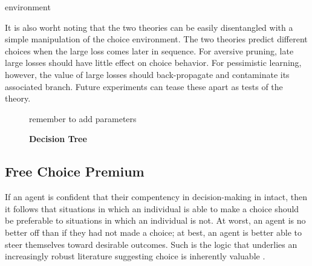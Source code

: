 environment\documentclass[11pt]{article} %
\begin{document}
It is also worht noting that the two theories can be easily disentangled with a
simple manipulation of the choice environment. The two theories predict
different choices when the large loss comes later in sequence. For aversive pruning,
late large losses should have little effect on choice behavior. For pessimistic
learning, however, the value of large losses should back-propagate and contaminate
its associated branch. Future experiments can tease these apart as tests of the theory.

\begin{figure}
  \centerline{%
  }
  \caption{\textbf{Decision Tree}}
  \par remember to add parameters
\end{figure}

\subsection{Free Choice Premium}

If an agent is confident that their compentency in decision-making in intact,
then it follows that situations in which an individual is able to make a choice
should be preferable to situations in which an individual is not. At worst,
an agent is no better off than if they had not made a choice; at best, an agent
is better able to steer themselves toward desirable outcomes. Such is the logic
that underlies an increasingly robust literature suggesting choice is inherently
valuable \citep{Leotti2010}.
\end{document}
